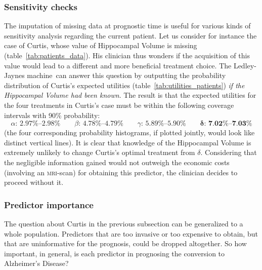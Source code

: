\documentclass[utf8]{FrontiersinHarvard_mod} %
\renewcommand*{\|}[1][]{\nonscript\:#1\vert\nonscript\:\mathopen{}}
\newcommand*{\ad}{Alzheimer's Disease}
\newcommand*{\ljm}{Ledley-Jaynes machine}
\begin{document}
\subsubsection{Sensitivity checks}
\label{sec:sensitivity}

The imputation of missing data at prognostic time is useful for various kinds of sensitivity analysis regarding the current patient. Let us consider for instance the case of Curtis, whose value of Hippocampal Volume is missing (table~\ref{tab:patients_data}). His clinician thus wonders if the acquisition of this value would lead to a different and more beneficial treatment choice. The \ljm\ can answer this question by outputting the probability distribution of Curtis's expected utilities (table~\ref{tab:utilities_patients}) \emph{if the Hippocampal Volume had been known}. The result is that the expected utilities for the four treatments in Curtis's case must be within the following coverage intervals with 90\% probability:
\begin{equation}
  \label{eq:possible_utilities_curtis}
  \alpha\text{: 2.97\%--2.98\%}\qquad
  \beta\text{: 4.78\%--4.79\%}\qquad
  \gamma\text{: 5.89\%--5.90\%}\qquad
  \bm{\delta}\textbf{: 7.02\%--7.03\%}
\end{equation}
(the four corresponding probability histograms, if plotted jointly, would look like distinct vertical lines). It is clear that knowledge of the Hippocampal Volume is extremely unlikely to change Curtis's optimal treatment from $\delta$. Considering that the negligible information gained would not outweigh the economic costs (involving an \textsc{mri}-scan) for obtaining this predictor, the clinician decides to proceed without it.

\subsubsection{Predictor importance}
\label{sec:predictor_importance}


The question about Curtis in the previous subsection can be generalized to a whole population. Predictors that are too invasive or too expensive to obtain, but that are uninformative for the prognosis, could be dropped altogether. So how important, in general, is each predictor in prognosing the conversion to \ad?
\end{document}
